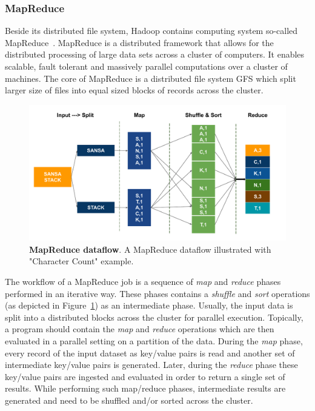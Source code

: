 \subsubsection{MapReduce}
Beside its distributed file system, Hadoop contains computing system so-called MapReduce~\cite{dg2004mapreduce}.
MapReduce is a distributed framework that allows for the distributed processing of large data sets across a cluster of computers.
It enables scalable, fault tolerant and massively parallel computations over a cluster of machines.
The core of MapReduce is a distributed file system \gls{GFS} which split larger size of files into equal sized blocks of records across the cluster. 

\begin{figure}
\centering
\includegraphics[width=1.0\columnwidth]{images/2_preliminaries/mapreduce-dataflow.pdf}
 \caption{\textbf{MapReduce dataflow}. A MapReduce dataflow illustrated with "Character Count" example.}
\label{fig:preliminaries-mapreduce-dataflow}
\end{figure}


The workflow of a MapReduce job is a sequence of \textit{map} and \textit{reduce} phases performed in an iterative way.
These phases contains a \textit{shuffle} and \textit{sort} operations (as depicted in Figure~\ref{fig:preliminaries-mapreduce-dataflow}) as an intermediate phase.
Usually, the input data is split into a distributed blocks across the cluster for parallel execution.
Topically, a program should contain the \textit{map} and \textit{reduce} operations which are then evaluated in a parallel setting on a partition of the data.
During the \textit{map} phase, every record of the input dataset as key/value pairs is read and another set of intermediate key/value pairs is generated.
Later, during the \textit{reduce} phase these key/value pairs are ingested and evaluated in order to return a single set of results.
While performing such map/reduce phases, intermediate results are generated and need to be shuffled and/or sorted across the cluster.

